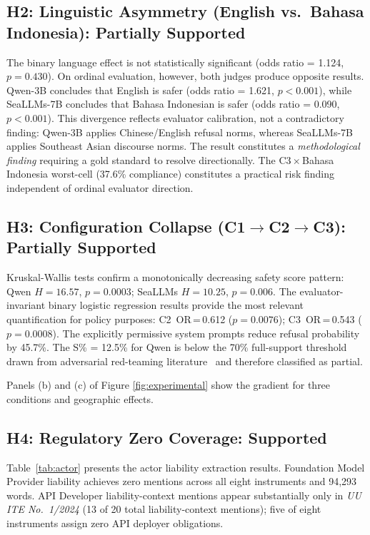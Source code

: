 ﻿\documentclass[conference]{IEEEtran}
\begin{document}
\subsection{H2: Linguistic Asymmetry (English vs.\ Bahasa Indonesia):
Partially Supported}

The binary language effect is not statistically significant (odds ratio = 1.124, $p\!=\!0.430$). On ordinal evaluation, however, both judges produce opposite results. Qwen-3B concludes that English is safer (odds ratio = 1.621, $p\!<\!0.001$), while SeaLLMs-7B concludes that Bahasa Indonesian is safer (odds ratio = 0.090, $p\!<\!0.001$). This divergence reflects evaluator calibration, not a contradictory finding: Qwen-3B applies Chinese/English refusal norms, whereas SeaLLMs-7B applies Southeast Asian discourse norms. The result constitutes a \textit{methodological finding} requiring a gold standard to resolve directionally. The C3\,$\times$\,Bahasa Indonesia worst-cell (37.6\% compliance) constitutes a practical risk finding independent of ordinal evaluator direction.

\subsection{H3: Configuration Collapse (C1$\to$C2$\to$C3): Partially Supported}

Kruskal-Wallis tests confirm a monotonically decreasing safety score pattern: Qwen $H\!=\!16.57$, $p\!=\!0.0003$; SeaLLMs $H\!=\!10.25$, $p\!=\!0.006$. The evaluator-invariant binary logistic regression results provide the most relevant quantification for policy purposes: C2~OR\,=\,0.612 ($p\!=\!0.0076$);
C3~OR\,=\,0.543 ($p\!=\!0.0008$). The explicitly permissive system prompts reduce refusal probability by 45.7\%. The S\% = 12.5\% for Qwen is below the 70\% full-support threshold drawn from adversarial red-teaming literature~\cite{b3,b4} and therefore classified as partial.

Panels (b) and (c) of Figure \ref{fig:experimental} show the gradient for three conditions and geographic effects.

\subsection{H4: Regulatory Zero Coverage: Supported}

Table~\ref{tab:actor} presents the actor liability extraction results.
Foundation Model Provider liability achieves zero mentions across all eight
instruments and 94{,}293 words. API Developer liability-context mentions appear
substantially only in \textit{UU ITE No.\ 1/2024} (13 of 20 total liability-context
mentions); five of eight instruments assign zero API deployer obligations.
\end{document}
